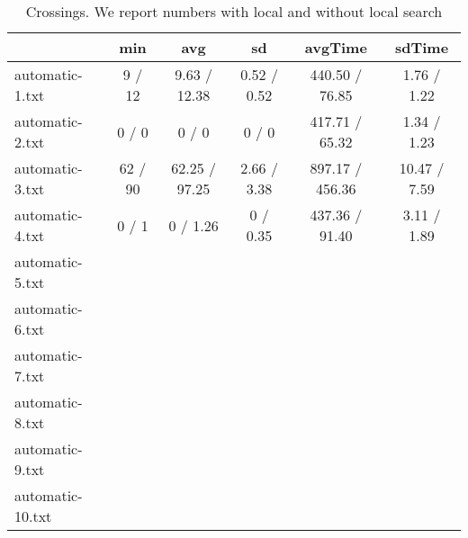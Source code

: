 \documentclass{scrartcl}
\begin{document}
\begin{table}
\begin{tabular}{lccccc}
  \toprule  & min & avg & sd & avgTime & sdTime \\ 
  \midrule automatic-1.txt & 9 / 12 & 9.63 / 12.38 & 0.52 / 0.52 & 440.50 / 76.85 & 1.76 / 1.22 \\ 
  automatic-2.txt & 0 / 0 & 0 / 0  & 0 / 0 & 417.71 / 65.32 & 1.34 / 1.23 \\ 
  automatic-3.txt & 62 / 90 & 62.25 / 97.25 & 2.66 / 3.38 & 897.17 / 456.36 & 10.47 / 7.59 \\ 
  automatic-4.txt & 0 / 1 & 0 / 1.26 & 0 / 0.35 & 437.36 / 91.40 & 3.11 / 1.89 \\ 
  automatic-5.txt &  &  &  &  & \\ 
  automatic-6.txt &  &  &  &  & \\ 
  automatic-7.txt &  &  &  &  & \\ 
  automatic-8.txt &  &  &  &  & \\ 
  automatic-9.txt &  &  &  &  & \\ 
  automatic-10.txt & &  &  &  & \\ 
  \bottomrule 
\end{tabular}
\caption{Crossings. We report numbers with local and without local search}
\end{table}
\end{document}

